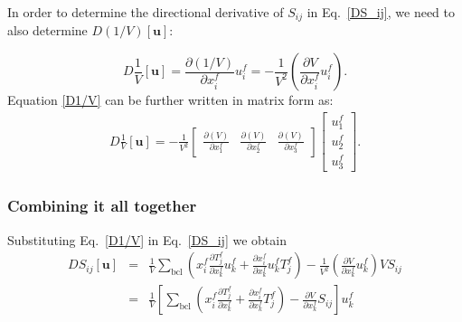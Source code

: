 In order to determine the directional derivative of $S_{ij}$ in Eq.\ \eqref{DS_ij}, we need to also determine $D \left(1/V\right) [\textbf{u}]$:
%

\begin{equation}
D \frac{1}{V}[\textbf{u}] = \frac{\partial (1/V)}{\partial x_i^f} u_i^f = -\frac{1}{V^2} \left( \frac{\partial V}{\partial x_i^f} u_i^f\right).
\label{D1/V}
\end{equation}
%
Equation \eqref{D1/V} can be further written in matrix form as:
%
\begin{eqnarray}
D\frac{1}{V}[\textbf{u}] = -\frac{1}{V^2}
\begin{bmatrix}
\frac{\partial (V)}{\partial x_1^f} & \frac{\partial (V)}{\partial x_2^f} & \frac{\partial(V)}{\partial x_3^f}
\end{bmatrix}
%
\begin{bmatrix}
u_1^f \\ u_2^f \\ u_3^f
\end{bmatrix}.
\label{D1/V_matrix}
\end{eqnarray}
%

\subsubsection{Combining it all together}

Substituting Eq.\ \eqref{D1/V} in Eq.\ \eqref{DS_ij} we obtain
%
\begin{eqnarray}
DS_{ij}[\textbf{u}] &=&  \frac{1}{V} \sum_{\text{bcl}} \left(x_i^f \frac{\partial T_j^f}{\partial x_k^f} u_k^f + \frac{\partial x_i^f}{\partial x_k^f}u_k^f T_j^f \right) -\frac{1}{V^2} \left( \frac{\partial V}{\partial x_k^f} u_k^f\right) V S_{ij} \nonumber\\
%
&=&  \frac{1}{V} \left[ \sum_{\text{bcl}} \left(x_i^f \frac{\partial T_j^f}{\partial x_k^f} + \frac{\partial x_i^f}{\partial x_k^f} T_j^f \right) -  \frac{\partial V}{\partial x_k^f} S_{ij} \right] u_k^f
\end{eqnarray}
%